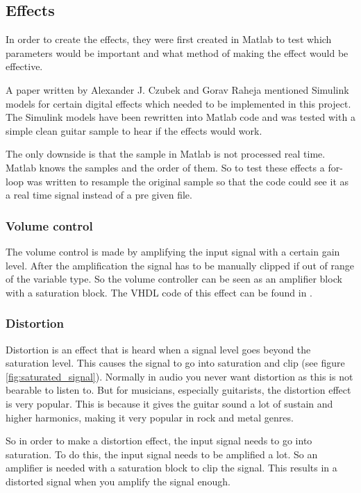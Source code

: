\subsection{Effects}
In order to create the effects, they were first created in Matlab to test which parameters would be important and what method of making the effect would be effective. 

A paper \cite{Guitar_Effects_Processor_Using_DSP} written by Alexander J. Czubek and Gorav Raheja mentioned Simulink models for certain digital effects which needed to be implemented in this project. The Simulink models have been rewritten into Matlab code and was tested with a simple clean guitar sample to hear if the effects would work. 

The only downside is that the sample in Matlab is not processed real time. Matlab knows the samples and the order of them. So to test these effects a for-loop was written to resample the original sample so that the code could see it as a real time signal instead of a pre given file.

\subsubsection{Volume control}
The volume control is made by amplifying the input signal with a certain gain level. After the amplification the signal has to be manually clipped if out of range of the variable type. So the volume controller can be seen as an amplifier block with a saturation block. The VHDL code of this effect can be found in \nameref{}.

\subsubsection{Distortion}
Distortion is an effect that is heard when a signal level goes beyond the saturation level. This causes the signal to go into saturation and clip (see figure \ref{fig:saturated_signal}). Normally in audio you never want distortion as this is not bearable to listen to. But for musicians, especially guitarists, the distortion effect is very popular. This is because it gives the guitar sound a lot of sustain and higher harmonics, making it very popular in rock and metal genres. 

So in order to make a distortion effect, the input signal needs to go into saturation. To do this, the input signal needs to be amplified a lot. So an amplifier is needed with a saturation block to clip the signal. This results in a distorted signal when you amplify the signal enough.

